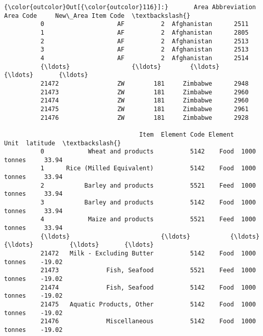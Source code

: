 \documentclass[11pt]{article}
\begin{document}
\begin{Verbatim}[commandchars=\\\{\}]
{\color{outcolor}Out[{\color{outcolor}116}]:}       Area Abbreviation  Area Code     New\_Area Item Code  \textbackslash{}
          0                    AF          2  Afghanistan      2511   
          1                    AF          2  Afghanistan      2805   
          2                    AF          2  Afghanistan      2513   
          3                    AF          2  Afghanistan      2513   
          4                    AF          2  Afghanistan      2514   
          {\ldots}                 {\ldots}        {\ldots}          {\ldots}       {\ldots}   
          21472                ZW        181     Zimbabwe      2948   
          21473                ZW        181     Zimbabwe      2960   
          21474                ZW        181     Zimbabwe      2960   
          21475                ZW        181     Zimbabwe      2961   
          21476                ZW        181     Zimbabwe      2928   
          
                                     Item  Element Code Element         Unit  latitude  \textbackslash{}
          0            Wheat and products          5142    Food  1000 tonnes     33.94   
          1      Rice (Milled Equivalent)          5142    Food  1000 tonnes     33.94   
          2           Barley and products          5521    Feed  1000 tonnes     33.94   
          3           Barley and products          5142    Food  1000 tonnes     33.94   
          4            Maize and products          5521    Feed  1000 tonnes     33.94   
          {\ldots}                         {\ldots}           {\ldots}     {\ldots}          {\ldots}       {\ldots}   
          21472   Milk - Excluding Butter          5142    Food  1000 tonnes    -19.02   
          21473             Fish, Seafood          5521    Feed  1000 tonnes    -19.02   
          21474             Fish, Seafood          5142    Food  1000 tonnes    -19.02   
          21475   Aquatic Products, Other          5142    Food  1000 tonnes    -19.02   
          21476             Miscellaneous          5142    Food  1000 tonnes    -19.02   
          

\end{Verbatim}
\end{document}
